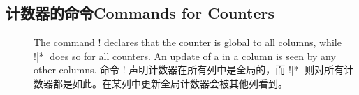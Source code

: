 
 \subsection{计数器的命令\hfill Commands for Counters}
 \label{sec:ref-counter}
 
\begin{description}
\item[\Midx{\!\globalcounter!}]\mbox{}
\Item[\Midx{\!\globalcounter!}\texttt{*}]\mbox{}\par
{}
\begin{paracol}{2}
The command \!\globalcounter! declares that the counter
 is global to all columns, while \!\globalcounter!|*| does so
for all counters.  An update of a \Uidx\gcounter{} in a column is seen by
any other columns.
\switchcolumn
命令 \!\globalcounter! 声明计数器在所有列中是全局的，而 \!\globalcounter!|*| 则对所有计数器都是如此。在某列中更新全局计数器会被其他列看到。 
\end{paracol}

\begin{itemize}
\begin{paracol}{2}


\end{paracol}
\end{itemize}
\end{description}
